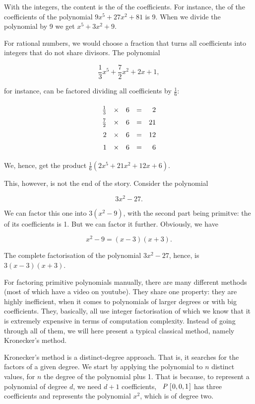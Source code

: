 \documentclass[tikz]{scrreprt}
\newcommand{\Conid}[1]{\mathit{#1}}
\begin{document}
With the integers, the content is the  of the
coefficients. For instance, the  
of the coefficients of the polynomial 
$9x^5 + 27x^2 + 81$ is 9. 
When we divide the polynomial by 9 we get
$x^5 + 3x^2 + 9$.

For rational numbers, we would choose a fraction
that turns all coefficients into integers that do
not share divisors. The polynomial

\[
\frac{1}{3}x^5 + \frac{7}{2}x^2 + 2x + 1,
\]

for instance, can be factored dividing 
all coefficients by $\frac{1}{6}$:

\[
\begingroup
\renewcommand{\arraystretch}{1.5}
\begin{array}{rcrcr}
\frac{1}{3} & \times & 6 & = & 2\\
\frac{7}{2} & \times & 6 & = & 21\\
2 & \times & 6 & = & 12\\
1 & \times & 6 & = & 6
\end{array}
\endgroup
\]

We, hence, get the product
$\frac{1}{6}(2x^5 + 21x^2 + 12x + 6)$.

This, however, is not the end of the story.
Consider the polynomial 

\[
3x^2 - 27.
\]

We can factor this one into
$3(x^2 - 9)$, with the second part being
primitve: the  of its coefficients
is 1. But we can factor it further.
Obviously, we have

\begin{equation}
x^2 - 9 = (x - 3)(x + 3).
\end{equation}

The complete factorisation of the polynomial
$3x^2 - 27$, hence, is $3(x-3)(x+3)$.

For factoring primitive polynomials manually, there
are many different methods (most of which have a
video on youtube). They share one property:
they are highly inefficient, when it comes
to polynomials of larger degrees or with big
coefficients. They, basically, all use integer
factorisation of which we know that it is extremely
expensive in terms of computation complexity.
Instead of going through all of them, we will here
present a typical classical method, namely Kronecker's
method.

Kronecker's method is a distinct-degree approach. 
That is, it searches for the factors of a given degree.
We start by applying the polynomial to $n$ distinct values,
for $n$ the degree of the polynomial plus 1.
That is because, to represent a polynomial of degree $d$,
we need $d+1$ coefficients, \eg\ \ensuremath{\Conid{P}\;[\mskip1.5mu \mathrm{0},\mathrm{0},\mathrm{1}\mskip1.5mu]} has three
coefficients and represents the polynomial $x^2$, which is
of degree two.
\end{document}
